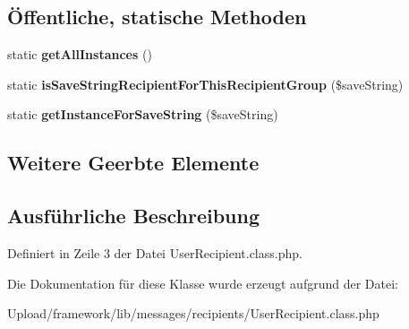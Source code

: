 \subsection*{Öffentliche, statische Methoden}
\begin{DoxyCompactItemize}
\item 
\mbox{\label{class_user_recipient_ae6fcd2b6fc9193e369dc093f78b24414}} 
static {\bfseries get\+All\+Instances} ()
\item 
\mbox{\label{class_user_recipient_a36336f65d2ac397786351726656ab080}} 
static {\bfseries is\+Save\+String\+Recipient\+For\+This\+Recipient\+Group} (\$save\+String)
\item 
\mbox{\label{class_user_recipient_ac86654edac7d4a25f7054a4c5ab302d9}} 
static {\bfseries get\+Instance\+For\+Save\+String} (\$save\+String)
\end{DoxyCompactItemize}
\subsection*{Weitere Geerbte Elemente}


\subsection{Ausführliche Beschreibung}


Definiert in Zeile 3 der Datei User\+Recipient.\+class.\+php.



Die Dokumentation für diese Klasse wurde erzeugt aufgrund der Datei\+:\begin{DoxyCompactItemize}
\item 
Upload/framework/lib/messages/recipients/User\+Recipient.\+class.\+php\end{DoxyCompactItemize}
